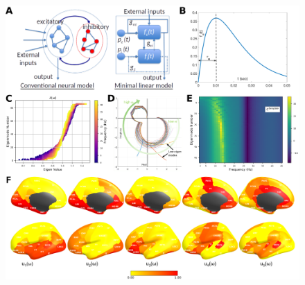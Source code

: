 \begin{figure}[htbp]
    \centering
    \includegraphics[scale=0.83]{../figures/chapter5/figure1.png}

\end{figure}
